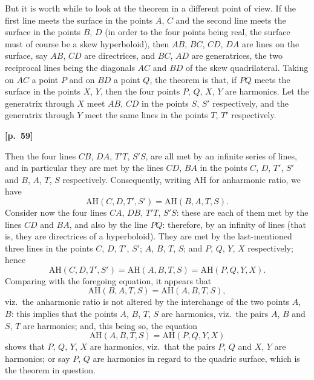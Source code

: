 \documentclass[11pt,a4paper]{book}
\begin{document}
But it is worth while to look at the theorem in a different point of view. If the first line meets the surface in the points $A$, $C$ and the second line meets the surface in the points $B$, $D$ (in order to the four points being real, the surface must of course be a skew hyperboloid), then $AB$, $BC$, $CD$, $DA$ are lines on the surface, say $AB$, $CD$ are directrices, and $BC$, $AD$ are generatrices, the two reciprocal lines being the diagonals $AC$ and $BD$ of the skew quadrilateral. Taking on $AC$ a point $P$ and on $BD$ a point $Q$, the theorem is that, if $PQ$ meets the surface in the points $X$, $Y$, then the four points $P$, $Q$, $X$, $Y$ are harmonics. Let the generatrix through $X$ meet $AB$, $CD$ in the points $S$, $S'$ respectively, and the generatrix through $Y$ meet the same lines in the points $T$, $T'$ respectively.

\vspace{0.5em}
\noindent\textbf{[p.\ 59]}

Then the four lines $CB$, $DA$, $T'T$, $S'S$, are all met by an infinite series of lines, and in particular they are met by the lines $CD$, $BA$ in the points $C$, $D$, $T'$, $S'$ and $B$, $A$, $T$, $S$ respectively. Consequently, writing AH for anharmonic ratio, we have
$$
\text{AH}(C, D, T', S') = \text{AH}(B, A, T, S).
$$
Consider now the four lines $CA$, $DB$, $T'T$, $S'S$: these are each of them met by the lines $CD$ and $BA$, and also by the line $PQ$: therefore, by an infinity of lines (that is, they are directrices of a hyperboloid). They are met by the last-mentioned three lines in the points $C$, $D$, $T'$, $S'$; $A$, $B$, $T$, $S$; and $P$, $Q$, $Y$, $X$ respectively; hence
$$
\text{AH}(C, D, T', S') = \text{AH}(A, B, T, S) = \text{AH}(P, Q, Y, X).
$$
Comparing with the foregoing equation, it appears that
$$
\text{AH}(B, A, T, S) = \text{AH}(A, B, T, S),
$$
viz.\ the anharmonic ratio is not altered by the interchange of the two points $A$, $B$: this implies that the points $A$, $B$, $T$, $S$ are harmonics, viz.\ the pairs $A$, $B$ and $S$, $T$ are harmonics; and, this being so, the equation
$$
\text{AH}(A, B, T, S) = \text{AH}(P, Q, Y, X)
$$
shows that $P$, $Q$, $Y$, $X$ are harmonics, viz.\ that the pairs $P$, $Q$ and $X$, $Y$ are harmonics; or say $P$, $Q$ are harmonics in regard to the quadric surface, which is the theorem in question.

\newpage
\end{document}
